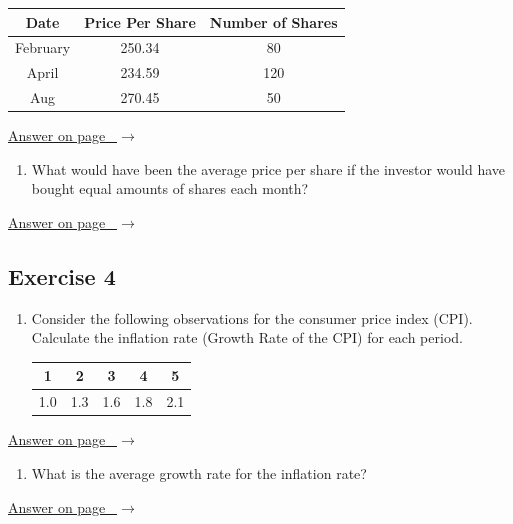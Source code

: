 \documentclass[
  11pt,
  letterpaper,
  DIV=11,
  numbers=noendperiod,
  oneside,
  open=any]{scrreprt}
\providecommand{\tightlist}{%
  \setlength{\itemsep}{0pt}\setlength{\parskip}{0pt}}\usepackage{longtable,booktabs,array}
\newcommand{\bsanswerref}[1]{%
  \par\nopagebreak\hypertarget{q-#1}{}\label{q-#1}%
  {\raggedleft\sffamily\footnotesize\hyperlink{a-#1}{\textcolor{bsaccent}{Answer on page \pageref{a-#1}\ $\rightarrow$}}\par}%
  \medskip}
\begin{document}
\begin{center}
\begin{tabular}{ccc}
\toprule
Date & Price Per Share & Number of Shares \\
\midrule
February & 250.34 & 80 \\
April & 234.59 & 120 \\
Aug & 270.45 & 50 \\
\bottomrule
\end{tabular}
\end{center}

\bsanswerref{bsans24}

\begin{enumerate}
\def\labelenumi{\arabic{enumi}.}
\setcounter{enumi}{1}
\tightlist
\item
  What would have been the average price per share if the investor would
  have bought equal amounts of shares each month?
\end{enumerate}

\bsanswerref{bsans25}

\subsection*{Exercise 4}\label{exercise-4-1}

\begin{enumerate}
\def\labelenumi{\arabic{enumi}.}
\item
  Consider the following observations for the consumer price index
  (CPI). Calculate the inflation rate (Growth Rate of the CPI) for each
  period.

  \begin{center}
  \begin{tabular}{ccccc}
  \toprule
  1 & 2 & 3 & 4 & 5 \\
  \midrule
  1.0 & 1.3 & 1.6 & 1.8 & 2.1 \\
  \bottomrule
  \end{tabular}
  \end{center}
\end{enumerate}

\bsanswerref{bsans26}

\begin{enumerate}
\def\labelenumi{\arabic{enumi}.}
\setcounter{enumi}{1}
\tightlist
\item
  What is the average growth rate for the inflation rate?
\end{enumerate}

\bsanswerref{bsans27}
\end{document}

